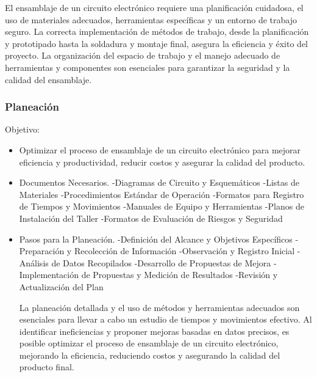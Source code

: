     El ensamblaje de un circuito electrónico requiere una planificación cuidadosa, el uso de materiales adecuados, herramientas específicas y un entorno de trabajo seguro. La correcta implementación de métodos de trabajo, desde la planificación y prototipado hasta la soldadura y montaje final, asegura la eficiencia y éxito del proyecto. La organización del espacio de trabajo y el manejo adecuado de herramientas y componentes son esenciales para garantizar la seguridad y la calidad del ensamblaje.
    \subsubsection{Planeación}
    Objetivo:
    \begin{itemize}
    \item Optimizar el proceso de ensamblaje de un circuito electrónico para mejorar eficiencia y productividad, reducir costos y asegurar la calidad del producto.
    \item Documentos Necesarios.
    -Diagramas de Circuito y Esquemáticos
    -Listas de Materiales
    -Procedimientos Estándar de Operación
    -Formatos para Registro de Tiempos y Movimientos
    -Manuales de Equipo y Herramientas
    -Planos de Instalación del Taller
    -Formatos de Evaluación de Riesgos y Seguridad
    
    \item Pasos para la Planeación.
    -Definición del Alcance y Objetivos Específicos
    -Preparación y Recolección de Información
    -Observación y Registro Inicial
    -Análisis de Datos Recopilados
    -Desarrollo de Propuestas de Mejora
    -Implementación de Propuestas y Medición de Resultados
    -Revisión y Actualización del Plan
    
    La planeación detallada y el uso de métodos y herramientas adecuados son esenciales para llevar a cabo un estudio de tiempos y movimientos efectivo. Al identificar ineficiencias y proponer mejoras basadas en datos precisos, es posible optimizar el proceso de ensamblaje de un circuito electrónico, mejorando la eficiencia, reduciendo costos y asegurando la calidad del producto final.
    \end{itemize}
